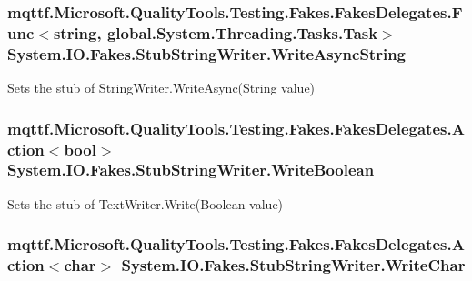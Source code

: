 \hypertarget{class_system_1_1_i_o_1_1_fakes_1_1_stub_string_writer_a39b098ddef8b6862d2302ba4298c161b}{
\subsubsection[{Write\-Async\-String}]{\setlength{\rightskip}{0pt plus 5cm}mqttf.\-Microsoft.\-Quality\-Tools.\-Testing.\-Fakes.\-Fakes\-Delegates.\-Func$<$string, global.\-System.\-Threading.\-Tasks.\-Task$>$ System.\-I\-O.\-Fakes.\-Stub\-String\-Writer.\-Write\-Async\-String}}\label{class_system_1_1_i_o_1_1_fakes_1_1_stub_string_writer_a39b098ddef8b6862d2302ba4298c161b}


Sets the stub of String\-Writer.\-Write\-Async(\-String value)

\hypertarget{class_system_1_1_i_o_1_1_fakes_1_1_stub_string_writer_a1f6044cf9a6bca0f968c8bc9bcdc87ba}{
\subsubsection[{Write\-Boolean}]{\setlength{\rightskip}{0pt plus 5cm}mqttf.\-Microsoft.\-Quality\-Tools.\-Testing.\-Fakes.\-Fakes\-Delegates.\-Action$<$bool$>$ System.\-I\-O.\-Fakes.\-Stub\-String\-Writer.\-Write\-Boolean}}\label{class_system_1_1_i_o_1_1_fakes_1_1_stub_string_writer_a1f6044cf9a6bca0f968c8bc9bcdc87ba}


Sets the stub of Text\-Writer.\-Write(\-Boolean value)

\hypertarget{class_system_1_1_i_o_1_1_fakes_1_1_stub_string_writer_a9c82eb35f37789f914836de0ba08ab08}{
\subsubsection[{Write\-Char}]{\setlength{\rightskip}{0pt plus 5cm}mqttf.\-Microsoft.\-Quality\-Tools.\-Testing.\-Fakes.\-Fakes\-Delegates.\-Action$<$char$>$ System.\-I\-O.\-Fakes.\-Stub\-String\-Writer.\-Write\-Char}}\label{class_system_1_1_i_o_1_1_fakes_1_1_stub_string_writer_a9c82eb35f37789f914836de0ba08ab08}


